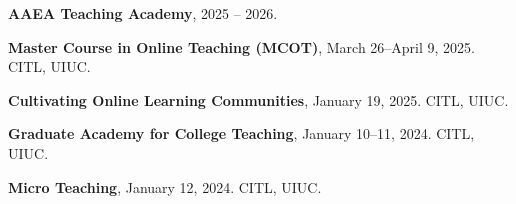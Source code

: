 \textbf{AAEA Teaching Academy}, 2025 -- 2026.

\textbf{Master Course in Online Teaching (MCOT)}, March 26--April 9, 2025. CITL, UIUC.

\textbf{Cultivating Online Learning Communities}, January 19, 2025. CITL, UIUC.

\textbf{Graduate Academy for College Teaching}, January 10--11, 2024. CITL, UIUC.

\textbf{Micro Teaching}, January 12, 2024. CITL, UIUC.
